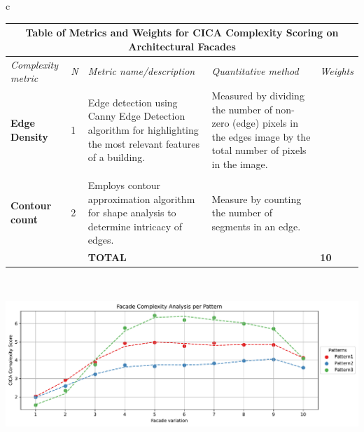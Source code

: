 \begin{linenumbers}
\begin{table}[!htb]
\centering
\small
\begin{tabular}{c}
\begin{minipage}{\textwidth}
\centering
{}
\label{tab:MetricsandWeights}
\begin{tabularx}{\textwidth}{p{2.5cm} p{1cm} X X >{\centering\arraybackslash}p{1cm}}
\toprule
\multicolumn{5}{c}{\textbf{Table of Metrics and Weights for CICA Complexity Scoring on Architectural Facades}} \\
\toprule
\textit{Complexity metric} & \textit{N} & \textit{Metric name/description} & \textit{Quantitative   method} & \textit{Weights} \\ \midrule
\textbf{Edge Density} &
1 &
Edge detection using Canny Edge Detection algorithm for highlighting the most relevant features of a building.& Measured by dividing the number of non-zero (edge) pixels in the edges image by the total number of pixels in the image.&
8\\
\\
\textbf{Contour count} &
2 &
Employs contour approximation algorithm for shape analysis to determine intricacy of edges.
&
Measure by counting the number of segments in an edge.
&
2\\ \bottomrule
&
&
\textbf{TOTAL} &
&
\textbf{10}\\ \bottomrule
\end{tabularx}
\end{minipage}
\\
\begin{minipage}{\textwidth}
\centering
\includegraphics[width= \linewidth]{Graphs/complexitygraphrender}

\end{minipage}
\end{tabular}
\end{table}
\end{linenumbers}
